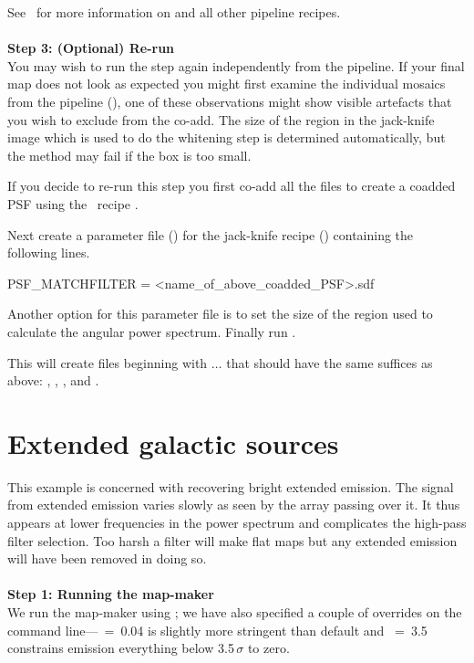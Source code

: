 \documentclass[11pt,oneside,chapters]{starlink}
\begin{document}
See \pipelinesun\ for more information on
 and all other pipeline
recipes.
\\ \\
\textbf{Step 3: (Optional) Re-run }\\
You may wish to run the  step again
independently from the pipeline. If your final map does not look as
expected you might first examine the individual mosaics from the
pipeline (), one of these observations might show visible
artefacts that you wish to exclude from the co-add. The size of the
region in the jack-knife image which is used to do the whitening step
is determined automatically, but the method may fail if the box is too
small.

If you decide to re-run this step you first co-add all the
 files to create a coadded PSF using the \picard\ recipe
.
\begin{terminalv}
\end{terminalv}
Next create a parameter file () for the jack-knife
recipe () containing the following lines.
\begin{terminalv}
PSF_MATCHFILTER = <name_of_above_coadded_PSF>.sdf
\end{terminalv}
Another option for this parameter file is  to set the
size of the region used to calculate the angular power spectrum.
Finally run .
\begin{terminalv}
\end{terminalv}
This will create files beginning with $\ldots$ that
should have the same suffices as above: ,
, , and .



\section{Extended galactic sources}
\label{sec:bright_ex}

This example is concerned with recovering bright extended emission.
The signal from extended emission varies slowly as seen by the array
passing over it. It thus appears at lower frequencies in the power
spectrum and complicates the high-pass filter selection. Too harsh a
filter will make flat maps but any extended emission will have been
removed in doing so.
\\ \\
\textbf{Step 1: Running the map-maker}
\vspace{0.2cm}\\
We run the map-maker using ;
we have also specified a couple of overrides on the command
line---~=~0.04 is slightly more stringent than default and
~=~3.5 constrains emission everything below
3.5\,$\sigma$ to zero.
\end{document}
